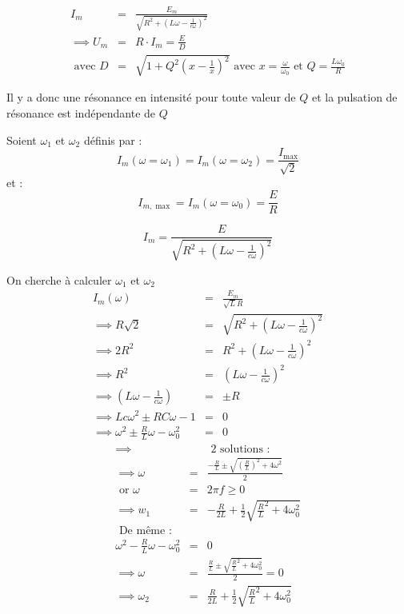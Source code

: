 
\begin{eqnarray*}
    I_{m} &=& \frac{E_{m}}{\sqrt{R^{2} + (L \omega -\frac{1}{c \omega })^{2}}} \\
    \implies U_{m} &=& R \cdot I_{m} = \frac{E}{D}  \\ 
    \text{ avec } D &=& \sqrt{1+Q^{2}(x-\frac{1}{x})^{2}} \text{ avec } x = \frac{\omega }{\omega _{0}} \text{ et } Q = \frac{L \omega_{0}}{R}
\end{eqnarray*}


Il y a donc une résonance en intensité pour toute valeur de \(Q\) et la pulsation de résonance est indépendante de \(Q\) 
\begin{definition}
    Soient \(\omega_{1}\) et \(\omega _{2}\) définis par : 
    \[
        I_{m}(\omega = \omega _{1}) = I_{m}(\omega = \omega_{2}) = \frac{I_{\max }}{\sqrt{2}}
    \]  
    et : 
    \[
        I_{m, \max } = I_{m} (\omega = \omega _{0}) = \frac{E}{R}
    \]
\end{definition}

\begin{remark}[rem]
    \[
        I_{m} = \frac{E}{\sqrt{R^{2} + (L \omega - \frac{1}{c \omega })^{2}}}
    \]
\end{remark}
\begin{corollary}
    On cherche à calculer \(\omega_{1}\) et \(\omega_{2}\)  
    \begin{eqnarray*}
        I_{m}(\omega ) &=& \frac{E_{m}}{\sqrt{L}R} \\
        \implies R \sqrt{2} &=& \sqrt{R^{2} + (L \omega -\frac{1}{c \omega })^{2}} \\
        \implies 2R^{2} &=& R^{2} + (L \omega -\frac{1}{c \omega })^{2} \\
        \implies R^{2} &=& (L \omega -\frac{1}{c \omega })^{2} \\
        \implies  (L \omega -\frac{1}{c \omega })  &=& \pm R \\
        \implies  Lc \omega^{2} \pm RC \omega  -1 &=& 0 \\
        \implies \omega^{2} \pm \frac{R}{L} \omega - \omega_{0}^{2} &=& 0
    \end{eqnarray*}
    \begin{eqnarray*}
        \implies &&\text{ 2 solutions : } \\
        \implies \omega  &=& \frac{-\frac{R}{L} \pm \sqrt{(\frac{R}{L})^{2} + 4\omega^{2}}}{2} \\
        \text{ or } \omega &=& 2 \pi f \geq 0 \\
        \implies w_{1} &=& -\frac{R}{2L} + \frac{1}{2} \sqrt{\frac{R}{L}^{2} + 4 \omega_{0}^{2}} \\
        \text{ De même : } && \\
        \omega^{2} -\frac{R}{L} \omega - \omega_{0}^{2} &=& 0 \\
        \implies \omega &=& \frac{\frac{R}{L} \pm \sqrt{\frac{R}{L}^{2} + 4\omega _{0}^{2}}}{2} = 0 \\
        \implies  \omega _{2} &=& \frac{R}{2L} +\frac{1}{2}\sqrt{\frac{R}{L}^{2} + 4\omega_{0}^{2}}
    \end{eqnarray*}
\end{corollary}


